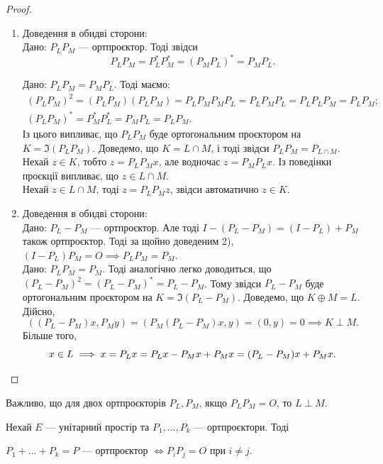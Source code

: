 \documentclass{math_library}
\begin{document}
\begin{proof}
\begin{enumerate}[topsep=0pt,wide=0pt,label={\arabic*)}]
\item Доведення в обидві сторони:\\
\rightproof Дано: $P_L P_M$ --- ортпроєктор. Тоді звідси
\[ 
P_L P_M = P_L^* P_M^* = (P_M P_L)^* = P_M P_L.
\]

\leftproof Дано: $P_LP_M = P_MP_L$. Тоді маємо:
\begin{align*}
(P_L P_M)^2 = (P_L P_M) (P_L P_M) = P_L P_M P_M P_L = P_L P_M P_L = P_L P_L P_M = P_L P_M;\\
(P_L P_M)^* = P_M^* P_L^* = P_M P_L = P_L P_M.
\end{align*}
Із цього випливає, що $P_LP_M$ буде ортогональним проєктором на $K = \Im (P_L P_M)$. Доведемо, що $K = L \cap M$, і тоді звідси $P_L P_M = P_{L \cap M}$.\\
Нехай $z \in K$, тобто $z = P_LP_M x$, але водночас $z = P_MP_L x$. Із поведінки проєкції випливає, що $z \in L \cap M$.\\
Нехай $z \in L \cap M$, тоді $z = P_L P_M z$, звідси автоматично $z \in K$.

\item Доведення в обидві сторони:\\
\rightproof Дано: $P_L - P_M$ --- ортпроєктор. Але тоді $I - (P_L - P_M) = (I - P_L) + P_M$ також ортпроєктор. Тоді за щойно доведеним 2), $(I-P_L) P_M = O \implies P_LP_M = P_M$.
\bigskip \\
\leftproof Дано: $P_L P_M = P_M$. Тоді аналогічно легко доводиться, що $(P_L-P_M)^2 = (P_L-P_M)^* = P_L-P_M$. Тому звідси $P_L - P_M$ буде ортогональним проєктором на $K = \Im(P_L - P_M)$. Доведемо, що $K \oplus M = L$. Дійсно,
\[
((P_L-P_M)x,P_My) = (P_M(P_L-P_M)x,y) = (0,y) = 0 \implies K \perp M.
\] Більше того, 
\[
x \in L \implies x = P_L x = P_L x - P_M x + P_M x = (P_L - P_M)x + P_M x.
\qedhere
\]
\end{enumerate}
\end{proof}

\begin{remark}
Важливо, що для двох ортпроєкторів $P_L,P_M$, якщо $P_L P_M = O$, то $L \perp M$.
\end{remark}

\begin{proposition}
Нехай $E$ --- унітарний простір та $P_1,\dots,P_k$ --- ортпроєктори. Тоді
\begin{center}
$P_1 + \dots + P_k = P$ --- ортпроєктор $\iff P_i P_j = O$ при $i \neq j$.
\end{center}
\end{proposition}
\end{document}
